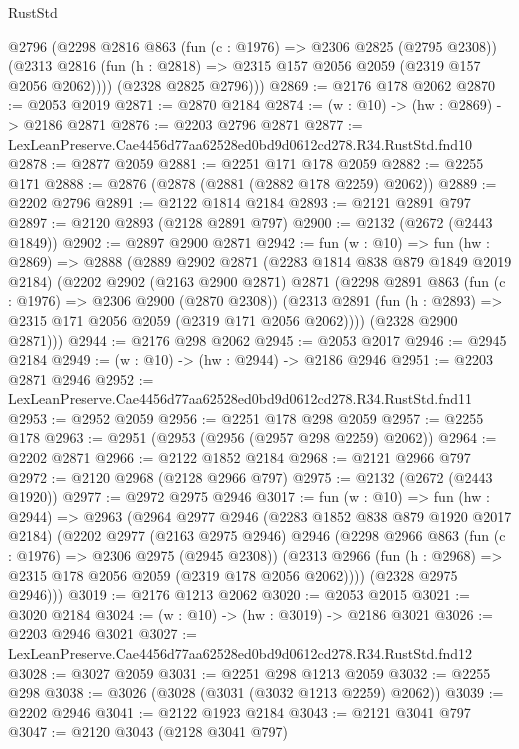 \begin{lexlean}{RustStd}
\begin{coremodule}
        @2796
        (@2298
          @2816
          @863
          (fun (c : @1976) => @2306 @2825 (@2795 @2308))
          (@2313 @2816 (fun (h : @2818) => @2315 @157 @2056 @2059 (@2319 @157 @2056 @2062))))
        (@2328 @2825 @2796)))
@2869 := @2176 @178 @2062
@2870 := @2053 @2019
@2871 := @2870 @2184
@2874 := (w : @10) -> (hw : @2869) -> @2186 @2871
@2876 := @2203 @2796 @2871
@2877 := LexLeanPreserve.Cae4456d77aa62528ed0bd9d0612cd278.R34.RustStd.fnd10
@2878 := @2877 @2059
@2881 := @2251 @171 @178 @2059
@2882 := @2255 @171
@2888 := @2876 (@2878 (@2881 (@2882 @178 @2259) @2062))
@2889 := @2202 @2796
@2891 := @2122 @1814 @2184
@2893 := @2121 @2891 @797
@2897 := @2120 @2893 (@2128 @2891 @797)
@2900 := @2132 (@2672 (@2443 @1849))
@2902 := @2897 @2900 @2871
@2942 := fun (w : @10) =>
  fun (hw : @2869) =>
  @2888
    (@2889
      @2902
      @2871
      (@2283 @1814 @838 @879 @1849 @2019 @2184)
      (@2202
        @2902
        (@2163 @2900 @2871)
        @2871
        (@2298
          @2891
          @863
          (fun (c : @1976) => @2306 @2900 (@2870 @2308))
          (@2313 @2891 (fun (h : @2893) => @2315 @171 @2056 @2059 (@2319 @171 @2056 @2062))))
        (@2328 @2900 @2871)))
@2944 := @2176 @298 @2062
@2945 := @2053 @2017
@2946 := @2945 @2184
@2949 := (w : @10) -> (hw : @2944) -> @2186 @2946
@2951 := @2203 @2871 @2946
@2952 := LexLeanPreserve.Cae4456d77aa62528ed0bd9d0612cd278.R34.RustStd.fnd11
@2953 := @2952 @2059
@2956 := @2251 @178 @298 @2059
@2957 := @2255 @178
@2963 := @2951 (@2953 (@2956 (@2957 @298 @2259) @2062))
@2964 := @2202 @2871
@2966 := @2122 @1852 @2184
@2968 := @2121 @2966 @797
@2972 := @2120 @2968 (@2128 @2966 @797)
@2975 := @2132 (@2672 (@2443 @1920))
@2977 := @2972 @2975 @2946
@3017 := fun (w : @10) =>
  fun (hw : @2944) =>
  @2963
    (@2964
      @2977
      @2946
      (@2283 @1852 @838 @879 @1920 @2017 @2184)
      (@2202
        @2977
        (@2163 @2975 @2946)
        @2946
        (@2298
          @2966
          @863
          (fun (c : @1976) => @2306 @2975 (@2945 @2308))
          (@2313 @2966 (fun (h : @2968) => @2315 @178 @2056 @2059 (@2319 @178 @2056 @2062))))
        (@2328 @2975 @2946)))
@3019 := @2176 @1213 @2062
@3020 := @2053 @2015
@3021 := @3020 @2184
@3024 := (w : @10) -> (hw : @3019) -> @2186 @3021
@3026 := @2203 @2946 @3021
@3027 := LexLeanPreserve.Cae4456d77aa62528ed0bd9d0612cd278.R34.RustStd.fnd12
@3028 := @3027 @2059
@3031 := @2251 @298 @1213 @2059
@3032 := @2255 @298
@3038 := @3026 (@3028 (@3031 (@3032 @1213 @2259) @2062))
@3039 := @2202 @2946
@3041 := @2122 @1923 @2184
@3043 := @2121 @3041 @797
@3047 := @2120 @3043 (@2128 @3041 @797)

\end{coremodule}
\end{lexlean}
